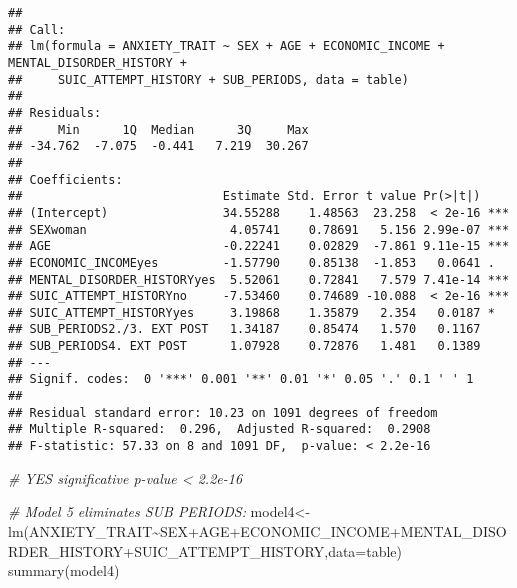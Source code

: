 \documentclass[
]{book}
\newenvironment{Shaded}{\begin{snugshade}}{\end{snugshade}}
\newcommand{\AttributeTok}[1]{\textcolor[rgb]{0.77,0.63,0.00}{#1}}
\newcommand{\CommentTok}[1]{\textcolor[rgb]{0.56,0.35,0.01}{\textit{#1}}}
\newcommand{\FunctionTok}[1]{\textcolor[rgb]{0.00,0.00,0.00}{#1}}
\newcommand{\NormalTok}[1]{#1}
\newcommand{\OtherTok}[1]{\textcolor[rgb]{0.56,0.35,0.01}{#1}}
\newcommand{\SpecialCharTok}[1]{\textcolor[rgb]{0.00,0.00,0.00}{#1}}
\begin{document}
\begin{verbatim}
## 
## Call:
## lm(formula = ANXIETY_TRAIT ~ SEX + AGE + ECONOMIC_INCOME + MENTAL_DISORDER_HISTORY + 
##     SUIC_ATTEMPT_HISTORY + SUB_PERIODS, data = table)
## 
## Residuals:
##     Min      1Q  Median      3Q     Max 
## -34.762  -7.075  -0.441   7.219  30.267 
## 
## Coefficients:
##                            Estimate Std. Error t value Pr(>|t|)    
## (Intercept)                34.55288    1.48563  23.258  < 2e-16 ***
## SEXwoman                    4.05741    0.78691   5.156 2.99e-07 ***
## AGE                        -0.22241    0.02829  -7.861 9.11e-15 ***
## ECONOMIC_INCOMEyes         -1.57790    0.85138  -1.853   0.0641 .  
## MENTAL_DISORDER_HISTORYyes  5.52061    0.72841   7.579 7.41e-14 ***
## SUIC_ATTEMPT_HISTORYno     -7.53460    0.74689 -10.088  < 2e-16 ***
## SUIC_ATTEMPT_HISTORYyes     3.19868    1.35879   2.354   0.0187 *  
## SUB_PERIODS2./3. EXT POST   1.34187    0.85474   1.570   0.1167    
## SUB_PERIODS4. EXT POST      1.07928    0.72876   1.481   0.1389    
## ---
## Signif. codes:  0 '***' 0.001 '**' 0.01 '*' 0.05 '.' 0.1 ' ' 1
## 
## Residual standard error: 10.23 on 1091 degrees of freedom
## Multiple R-squared:  0.296,  Adjusted R-squared:  0.2908 
## F-statistic: 57.33 on 8 and 1091 DF,  p-value: < 2.2e-16
\end{verbatim}

\begin{Shaded}
\begin{Highlighting}[]
\CommentTok{\# YES significative p{-}value \textless{} 2.2e{-}16}

\CommentTok{\# Model 5 eliminates SUB PERIODS:}
\NormalTok{model4}\OtherTok{\textless{}{-}}\FunctionTok{lm}\NormalTok{(ANXIETY\_TRAIT}\SpecialCharTok{\textasciitilde{}}\NormalTok{SEX}\SpecialCharTok{+}\NormalTok{AGE}\SpecialCharTok{+}\NormalTok{ECONOMIC\_INCOME}\SpecialCharTok{+}\NormalTok{MENTAL\_DISORDER\_HISTORY}\SpecialCharTok{+}\NormalTok{SUIC\_ATTEMPT\_HISTORY,}\AttributeTok{data=}\NormalTok{table)}
\FunctionTok{summary}\NormalTok{(model4)}
\end{Highlighting}
\end{Shaded}
\end{document}
